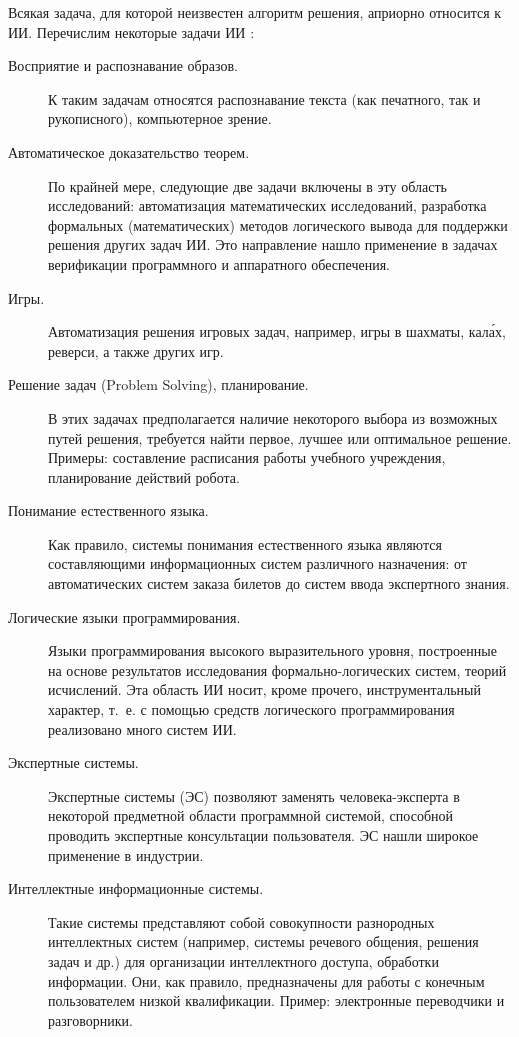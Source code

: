 \documentclass[12pt, openany, twoside]{book} %
\begin{document}
Всякая задача, для которой неизвестен алгоритм решения, априорно относится к ИИ. Перечислим некоторые задачи ИИ \cite{AIDictionary}:
\begin{description}
 \item [Восприятие и распознавание образов.] К таким задачам относятся распознавание текста (как печатного, так и рукописного), компьютерное зрение.
 \item [Автоматическое доказательство теорем.] По крайней мере, следующие две задачи включены в эту область ис\-сле\-до\-ваний: автоматизация математических исследований, разработка формальных (математических) методов логического вывода для поддержки решения других задач ИИ. Это направление нашло применение в задачах верификации программного и аппаратного обеспечения.
 \item [Игры.] Автоматизация решения игровых задач, например, игры в шахматы, кал\'{а}х, реверси, а также других игр.
 \item [Решение задач (Problem Solving), планирование.] В этих задачах предполагается наличие некоторого выбора из возможных путей решения, требуется найти первое, лучшее или оптимальное решение. Примеры: составление расписания работы учебного учреждения, планирование действий робота.
 \item [Понимание естественного языка.] Как правило, си\-сте\-мы понимания естественного языка являются составляющими информационных систем различного назначения: от автоматических систем заказа билетов до систем ввода экспертного знания.
 \item [Логические языки программирования.] Языки программирования  высокого выразительного уровня, построенные на основе результатов исследования формально-ло\-ги\-чес\-ких систем, теорий исчислений. Эта область ИИ носит, кроме прочего, инструментальный характер, т.~е. с помощью средств логического программирования реализовано много систем ИИ.
 \item [Экспертные системы.] Экспертные системы  (ЭС) позволяют заменять человека-эксперта в некоторой предметной области программной системой, способной проводить экспертные консультации пользователя. ЭС нашли широкое применение в индустрии.
 \item [Интеллектные информационные системы.] Такие сис\-те\-мы представляют собой совокупности  разнородных интеллектных систем (например, системы речевого общения, решения задач и др.) для организации интеллектного доступа, обработки информации. Они, как правило, предназначены для работы с конечным пользователем низкой квалификации. Пример: электронные переводчики и разговорники.

\end{description}
\end{document}
